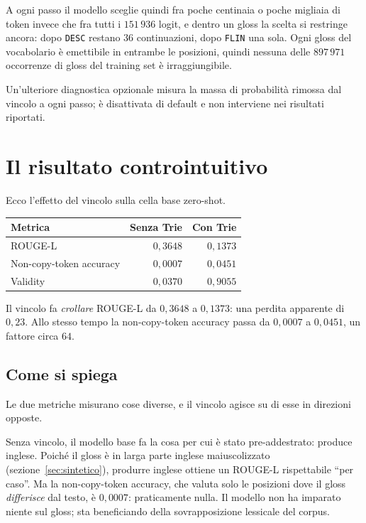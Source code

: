 A ogni passo il modello sceglie quindi fra poche centinaia o poche migliaia di
token invece che fra tutti i $151\,936$ logit, e dentro un gloss la scelta si
restringe ancora:
dopo \texttt{DESC} restano $36$ continuazioni, dopo \texttt{FLIN} una sola. Ogni
gloss del vocabolario è emettibile in entrambe le posizioni, quindi nessuna delle
$897\,971$ occorrenze di gloss del training set è irraggiungibile.

Un'ulteriore diagnostica opzionale misura la massa
di probabilità rimossa dal vincolo a ogni passo; è disattivata di default e non
interviene nei risultati riportati.

\section{Il risultato controintuitivo}
\label{sec:trie-risultato}

Ecco l'effetto del vincolo sulla cella base zero-shot.

\begin{center}
\begin{tabular}{lrr}
\toprule
Metrica & Senza Trie & Con Trie \\
\midrule
ROUGE-L & $0{,}3648$ & $0{,}1373$ \\
Non-copy-token accuracy & $0{,}0007$ & $0{,}0451$ \\
Validity & $0{,}0370$ & $0{,}9055$ \\
\bottomrule
\end{tabular}
\end{center}

Il vincolo fa \emph{crollare} ROUGE-L da $0{,}3648$ a $0{,}1373$: una perdita
apparente di $0{,}23$. Allo stesso tempo la non-copy-token accuracy passa da
$0{,}0007$ a $0{,}0451$, un fattore circa $64$.

\subsection{Come si spiega}

Le due metriche misurano cose diverse, e il vincolo agisce su di esse in
direzioni opposte.

Senza vincolo, il modello base fa la cosa per cui è stato pre-addestrato: produce
inglese. Poiché il gloss è in larga parte inglese maiuscolizzato
(sezione~\ref{sec:sintetico}), produrre inglese ottiene un ROUGE-L
rispettabile ``per caso''. Ma la non-copy-token accuracy, che valuta solo le
posizioni dove il gloss \emph{differisce} dal testo, è $0{,}0007$: praticamente
nulla. Il modello non ha imparato niente sul gloss; sta beneficiando della
sovrapposizione lessicale del corpus.

